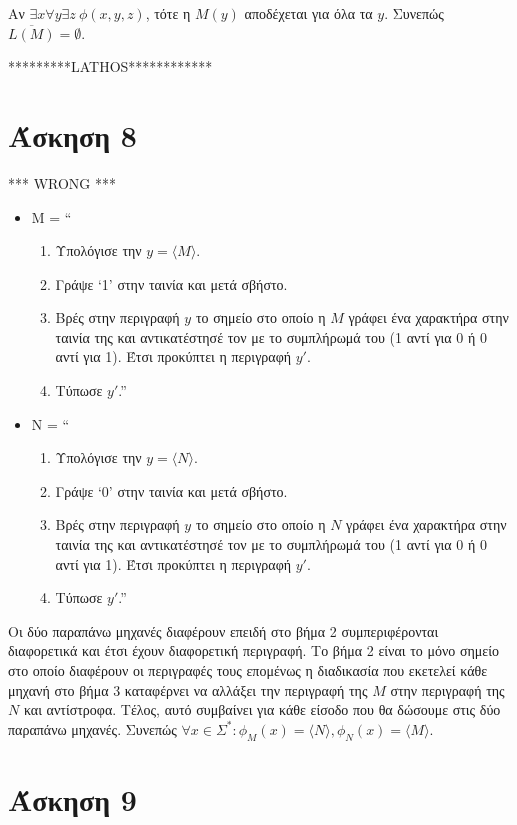 \documentclass[a4paper, oneside, 11pt]{article}
\theoremstyle{definition}
\begin{document}
Αν $\exists x\forall y\exists z\ \phi(x,y,z)$, τότε η $M(y)$ αποδέχεται για όλα τα $y$. Συνεπώς $\overline{L(M)}=\emptyset$.


*********LATHOS************

\section*{Άσκηση 8}

*** WRONG ***
\begin{itemize}
\item M = ``
\begin{enumerate}
\item Υπολόγισε την $y = \langle M \rangle$.
\item Γράψε `1' στην ταινία και μετά σβήστο.
\item Βρές στην περιγραφή $y$ το σημείο στο οποίο η $M$ γράφει
ένα χαρακτήρα στην ταινία της και αντικατέστησέ τον με το συμπλήρωμά του (1 αντί
για 0 ή 0 αντί για 1). Έτσι προκύπτει η περιγραφή $y'$.
\item Τύπωσε $y'$.''
\end{enumerate}
\item N = ``
\begin{enumerate}
\item Υπολόγισε την $y = \langle N \rangle$.
\item Γράψε `0' στην ταινία και μετά σβήστο.
\item Βρές στην περιγραφή $y$ το σημείο στο οποίο η $N$ γράφει
ένα χαρακτήρα στην ταινία της και αντικατέστησέ τον με το συμπλήρωμά του (1 αντί
για 0 ή 0 αντί για 1). Έτσι προκύπτει η περιγραφή $y'$.
\item Τύπωσε $y'$.''
\end{enumerate}
\end{itemize}

Οι δύο παραπάνω μηχανές διαφέρουν επειδή στο βήμα 2 συμπεριφέρονται διαφορετικά
και έτσι έχουν διαφορετική περιγραφή. Το βήμα 2 είναι το μόνο σημείο στο οποίο
διαφέρουν οι περιγραφές τους επομένως η διαδικασία που εκετελεί κάθε μηχανή στο
βήμα 3 καταφέρνει να αλλάξει την περιγραφή της $M$ στην περιγραφή της $N$ και
αντίστροφα. Τέλος, αυτό συμβαίνει για κάθε είσοδο που θα δώσουμε στις δύο
παραπάνω μηχανές. Συνεπώς $\forall x \in \Sigma^*: \phi_M(x) = \langle N
\rangle, \phi_N(x) = \langle M \rangle$.

\section*{Άσκηση 9}
\end{document}

